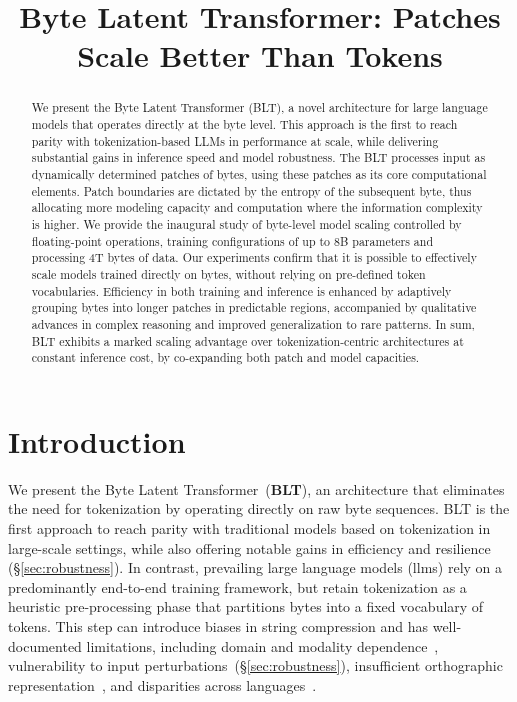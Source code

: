 \title{Byte Latent Transformer: Patches Scale Better Than Tokens}

\begin{abstract}
We present the Byte Latent Transformer ({\textsc BLT}), a novel architecture for large language models that operates directly at the byte level. This approach is the first to reach parity with tokenization-based LLMs in performance at scale, while delivering substantial gains in inference speed and model robustness. The {\textsc BLT} processes input as dynamically determined patches of bytes, using these patches as its core computational elements. Patch boundaries are dictated by the entropy of the subsequent byte, thus allocating more modeling capacity and computation where the information complexity is higher. We provide the inaugural study of byte-level model scaling controlled by floating-point operations, training configurations of up to 8B parameters and processing 4T bytes of data. Our experiments confirm that it is possible to effectively scale models trained directly on bytes, without relying on pre-defined token vocabularies. Efficiency in both training and inference is enhanced by adaptively grouping bytes into longer patches in predictable regions, accompanied by qualitative advances in complex reasoning and improved generalization to rare patterns. In sum, {\textsc BLT} exhibits a marked scaling advantage over tokenization-centric architectures at constant inference cost, by co-expanding both patch and model capacities.
\end{abstract}

\section{Introduction}
\label{section:intro}

We present the Byte Latent Transformer~(\textbf{BLT}), an architecture that eliminates the need for tokenization by operating directly on raw byte sequences. BLT is the first approach to reach parity with traditional models based on tokenization in large-scale settings, while also offering notable gains in efficiency and resilience (\S\ref{sec:robustness}). In contrast, prevailing large language models (llms) rely on a predominantly end-to-end training framework, but retain tokenization as a heuristic pre-processing phase that partitions bytes into a fixed vocabulary of tokens. This step can introduce biases in string compression and has well-documented limitations, including domain and modality dependence~\citep{dagangetting}, vulnerability to input perturbations~(\S\ref{sec:robustness}), insufficient orthographic representation~\citep{edman2024cute}, and disparities across languages~\citep{liang2023xlm,petrov2024language,limisiewicz2024myte}.

